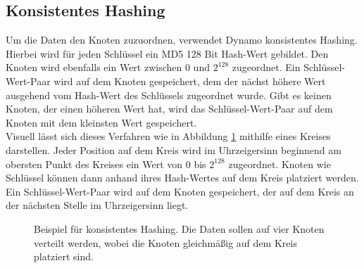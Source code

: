 \subsection{Konsistentes Hashing}
Um die Daten den Knoten zuzuordnen, verwendet Dynamo konsistentes Hashing. Hierbei wird für jeden Schlüssel ein MD5 128 Bit Hash-Wert gebildet. Den Knoten wird ebenfalls ein Wert zwischen $0$ und $2^{128}$ zugeordnet. Ein Schlüssel-Wert-Paar wird auf dem Knoten gespeichert, dem der nächst höhere Wert ausgehend vom Hash-Wert des Schlüssels zugeordnet wurde. Gibt es keinen Knoten, der einen höheren Wert hat, wird das Schlüssel-Wert-Paar auf dem Knoten mit dem kleinsten Wert gespeichert.\\
Visuell lässt sich dieses Verfahren wie in Abbildung \ref{fig:bspKonHash} mithilfe eines Kreises darstellen. Jeder Position auf dem Kreis wird im Uhrzeigersinn beginnend am obersten Punkt des Kreises ein Wert von $0$ bis $2^{128}$ zugeordnet. Knoten wie Schlüssel können dann anhand ihres Hash-Wertes auf dem Kreis platziert werden. Ein Schlüssel-Wert-Paar wird auf dem Knoten gespeichert, der auf dem Kreis an der nächsten Stelle im Uhrzeigersinn liegt.
\begin{figure}
	\caption{Beispiel für konsistentes Hashing. Die Daten sollen auf vier Knoten verteilt werden, wobei die Knoten gleichmäßig auf dem Kreis platziert sind.}
	\label{fig:bspKonHash}
	\centering
\end{figure}
